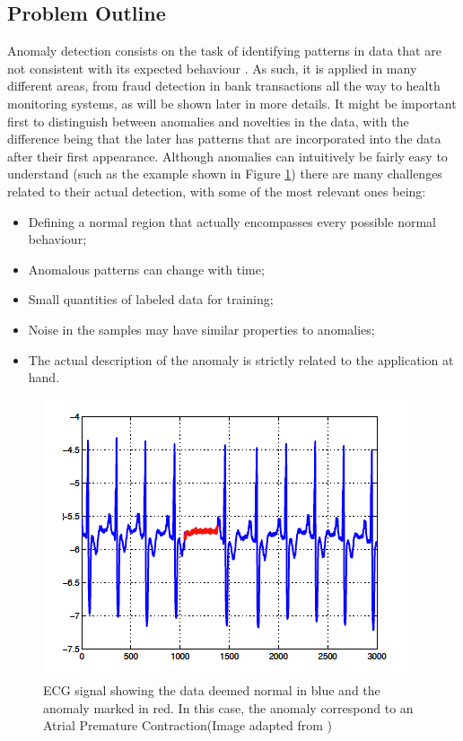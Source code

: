 \documentclass[../main.tex]{subfiles}
\begin{document}
    \subsection{Problem Outline}
        Anomaly detection consists on the task of identifying patterns in data that are not consistent with its expected behaviour \cite{chandola2009anomaly}. As such, it is applied in many different areas, from fraud detection in bank transactions all the way to health monitoring systems, as will be shown later in more details. It might be important first to distinguish between anomalies and novelties in the data, with the difference being that the later has patterns that are incorporated into the data after their first appearance. Although anomalies can intuitively be fairly easy to understand (such as the example shown in Figure \ref{fig:anomaly}) there are many challenges related to their actual detection, with some of the most relevant ones being:

        \begin{itemize}
            \item Defining a normal region that actually encompasses every possible normal behaviour;
            \item Anomalous patterns can change with time;
            \item Small quantities of labeled data for training;
            \item Noise in the samples may have similar properties to anomalies;
            \item The actual description of the anomaly is strictly related to the application at hand.          
        \end{itemize}

        \begin{figure}[h]
          \begin{center}
            \centering
            \includegraphics[width={0.6\columnwidth}]{images/ecg_anomaly.png}
            \caption{ECG signal showing the data deemed normal in blue and the anomaly marked in red. In this case, the anomaly correspond to an Atrial Premature Contraction(Image adapted from \cite{chandola2009anomaly})}
          \label{fig:anomaly}
          \end{center}
        \end{figure}
\end{document}
